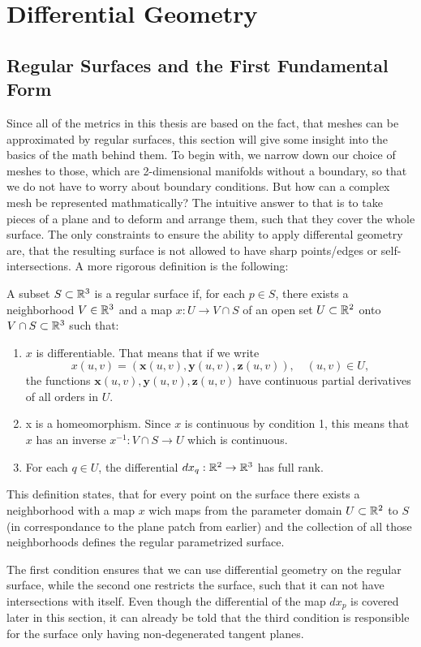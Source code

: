 \chapter{Differential Geometry}
\label{chapter:differentialGeometry}

\section{Regular Surfaces and the First Fundamental Form}
Since all of the metrics in this thesis are based on the fact, that meshes can be approximated by regular surfaces, this section will give some insight into the basics of the math behind them.
To begin with, we narrow down our choice of meshes to those, which are 2-dimensional manifolds without a boundary, so that we do not have to worry about boundary conditions.
But how can a complex mesh be represented mathmatically?
The intuitive answer to that is to take pieces of a plane and to deform and arrange them, such that they cover the whole surface.
The only constraints to ensure the ability to apply differental geometry are, that the resulting surface is not allowed to have sharp points/edges or self-intersections.
A more rigorous definition is the following:
\begin{mydef}
	A subset $S \subset \mathbb{R}^3$ is a regular surface if, for each $p \in S$, there exists a neighborhood $V \in \mathbb{R}^3$ and a map $x:U \rightarrow V \cap S$ of an open set $U \subset \mathbb{R}^2$ onto $V \cap S \subset \mathbb{R}^3$ such that:
	\begin{enumerate}
		\item $x$ is differentiable. That means that if we write
			$$x(u,v) = (\mathbf{x}(u,v), \mathbf{y}(u,v), \mathbf{z}(u,v)), \quad (u,v) \in U,$$
			the functions $\mathbf{x}(u,v), \mathbf{y}(u,v), \mathbf{z}(u,v)$ have continuous partial derivatives of all orders in $U$.
		\item x is a homeomorphism. Since $x$ is continuous by condition 1, this means that $x$ has an inverse $x^{-1}: V \cap S \rightarrow U$ which is continuous.
		\item For each $q \in U$, the differential $dx_q: \mathbb{R}^2 \rightarrow \mathbb{R}^3$ has full rank.
	\end{enumerate}
\end{mydef}
This definition states, that for every point on the surface there exists a neighborhood with a map $x$ wich maps from the parameter domain $U \subset \mathbb{R}^2$ to $S$ (in correspondance to the plane patch from earlier) and the collection of all those neighborhoods defines the regular parametrized surface.
\begin{remark}
	The first condition ensures that we can use differential geometry on the regular surface, while the second one restricts the surface, such that it can not have intersections with itself.
	Even though the differential of the map $dx_p$ is covered later in this section, it can already be told that the third condition is responsible for the surface only having non-degenerated tangent planes.
\end{remark}


